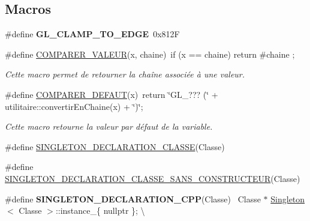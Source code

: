 \subsection*{Macros}
\begin{DoxyCompactItemize}
\item 
\hypertarget{group__utilitaire_gae90f81f48642444b4ba7fa5cacf40569}{}\#define {\bfseries G\+L\+\_\+\+C\+L\+A\+M\+P\+\_\+\+T\+O\+\_\+\+E\+D\+G\+E}~0x812\+F\label{group__utilitaire_gae90f81f48642444b4ba7fa5cacf40569}

\item 
\hypertarget{group__utilitaire_ga849df54224f798741d3fe046180dddfc}{}\#define \hyperlink{group__utilitaire_ga849df54224f798741d3fe046180dddfc}{C\+O\+M\+P\+A\+R\+E\+R\+\_\+\+V\+A\+L\+E\+U\+R}(x,  chaine)~if (x == chaine) return \#chaine ;\label{group__utilitaire_ga849df54224f798741d3fe046180dddfc}

\begin{DoxyCompactList}\small\item\em Cette macro permet de retourner la chaîne associée à une valeur. \end{DoxyCompactList}\item 
\hypertarget{group__utilitaire_gacd82c66571930dca394095824ff37a5c}{}\#define \hyperlink{group__utilitaire_gacd82c66571930dca394095824ff37a5c}{C\+O\+M\+P\+A\+R\+E\+R\+\_\+\+D\+E\+F\+A\+U\+T}(x)~return \char`\"{}G\+L\+\_\+??? (\char`\"{} + utilitaire\+::convertir\+En\+Chaine(x) + \char`\"{})\char`\"{};\label{group__utilitaire_gacd82c66571930dca394095824ff37a5c}

\begin{DoxyCompactList}\small\item\em Cette macro retourne la valeur par défaut de la variable. \end{DoxyCompactList}\item 
\#define \hyperlink{group__utilitaire_ga1e4ee9d5709f277c392eea80755d85d0}{S\+I\+N\+G\+L\+E\+T\+O\+N\+\_\+\+D\+E\+C\+L\+A\+R\+A\+T\+I\+O\+N\+\_\+\+C\+L\+A\+S\+S\+E}(Classe)
\item 
\#define \hyperlink{group__utilitaire_ga4e5462d4b058b18eaee177c1f3f50964}{S\+I\+N\+G\+L\+E\+T\+O\+N\+\_\+\+D\+E\+C\+L\+A\+R\+A\+T\+I\+O\+N\+\_\+\+C\+L\+A\+S\+S\+E\+\_\+\+S\+A\+N\+S\+\_\+\+C\+O\+N\+S\+T\+R\+U\+C\+T\+E\+U\+R}(Classe)
\item 
\hypertarget{group__utilitaire_ga8372ef255cff99ea87d0ccafb9ce57da}{}\#define {\bfseries S\+I\+N\+G\+L\+E\+T\+O\+N\+\_\+\+D\+E\+C\+L\+A\+R\+A\+T\+I\+O\+N\+\_\+\+C\+P\+P}(Classe)          ~Classe $\ast$ \hyperlink{class_singleton}{Singleton}$<$ Classe $>$\+::instance\+\_\+\{ nullptr \}; \textbackslash{}\label{group__utilitaire_ga8372ef255cff99ea87d0ccafb9ce57da}

\end{DoxyCompactItemize}

